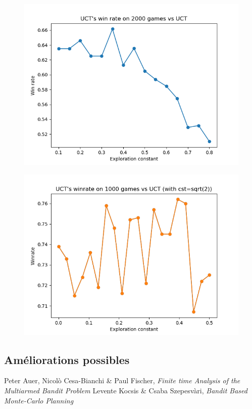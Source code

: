 \documentclass[a4paper]{article}
\theoremstyle{definition}
\begin{document}
\begin{figure}[h]
\centering
\includegraphics[scale=0.7]{test3.png}
\caption{}
\end{figure}

\begin{figure}[h]
\centering
\includegraphics[scale=0.7]{test4.png}
\caption{}
\end{figure}

\subsection{Améliorations possibles}

\clearpage
%
\begin{thebibliography}{9}

Peter Auer, Nicol\`o Cesa-Bianchi \& Paul Fischer, {\em Finite time Analysis of the Multiarmed Bandit Problem}
Levente Kocsis \& Csaba Szepesv\`ari, {\em Bandit Based Monte-Carlo Planning}

\end{thebibliography}
\end{document}
